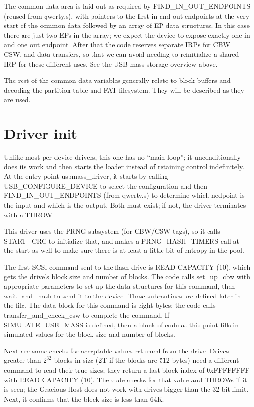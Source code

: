 The common data area is laid out as required by FIND\_IN\_OUT\_ENDPOINTS
(reused from qwerty.s), with pointers to the first in and out endpoints
at the very start of the common data followed by an array of EP data
structures.  In this case there are just two EPs in the array; we expect the
device to expose exactly one in and one out endpoint.  After that the code
reserves separate IRPs for CBW, CSW, and data transfers, so that we can
avoid needing to reinitialize a shared IRP for these different uses.  See
the USB mass storage overview above.

The rest of the common data variables generally relate to block buffers and
decoding the partition table and FAT filesystem.  They will be described as
they are used.

\section{Driver init}

Unlike most per-device drivers, this one has no ``main loop''; it
unconditionally does its work and then starts the loader instead of
retaining control indefinitely.  At the entry point usbmass\_driver, it
starts by calling USB\_CONFIGURE\_DEVICE to select the configuration and
then FIND\_IN\_OUT\_ENDPOINTS (from qwerty.s) to determine which nedpoint is
the input and which is the output.  Both must exist; if not, the driver
terminates with a THROW.

This driver uses the PRNG subsystem (for CBW/CSW tags), so it calls
START\_CRC to initialize that, and makes a PRNG\_HASH\_TIMERS call at the
start as well to make sure there is at least a little bit of entropy in the
pool.

The first SCSI command sent to the flash drive is READ CAPACITY (10), which
gets the drive's block size and number of blocks.  The code calls
set\_up\_cbw with appropriate parameters to set up the data structures for
this command, then wait\_and\_hash to send it to the device.  These
subroutines are defined later in the file.  The data block for this command
is eight bytes; the code calls transfer\_and\_check\_csw to complete the
command.  If SIMULATE\_USB\_MASS is defined, then a block of code at this
point fills in simulated values for the block size and number of blocks.

Next are some checks for acceptable values returned from the drive.  Drives
greater than $2^{32}$ blocks in size (2T if the blocks are 512 bytes) need a
different command to read their true sizes; they return a last-block index
of 0xFFFFFFFF with READ CAPACITY (10).  The code checks for that value and
THROWs if it is seen; the Gracious Host does not work with drives bigger
than the 32-bit limit.  Next, it confirms that the block size is less than
64K.

